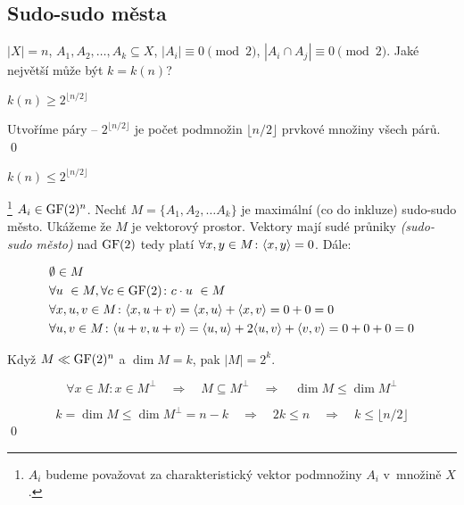 \subsection{Sudo-sudo města}

\df $|X| = n$, $A_1, A_2, \dots, A_k \subseteq X$, $|A_i| \equiv 0 \pmod 2$, $|A_i\cap
A_j| \equiv 0 \pmod 2$. Jaké největší může být $k = k(n)$?

\vt $k(n) \ge 2^{\lfloor n / 2 \rfloor}$

\dk Utvoříme páry -- $2^{\lfloor n / 2 \rfloor}$ je počet podmnožin $\lfloor n / 2
\rfloor$ prvkové množiny všech párů. \qed

\vt $k(n) \le 2^{\lfloor n / 2 \rfloor}$

\dk\footnote{$A_i$ budeme považovat za charakteristický vektor podmnožiny $A_i$
v~množině $X$.} $A_i \in \mathrm{GF}(2)^n$. Nechť $M=\{A_1, A_2, \dots A_k\}$ je maximální (co do inkluze)
sudo-sudo město. Ukážeme že $M$ je vektorový prostor.
Vektory mají sudé průniky {\it (sudo-sudo město)} nad $\mathrm{GF}(2)$ tedy platí $\forall x,y\in M\colon {\langle x,y\rangle} = 0$.
Dále:

\begin{align}
	&\emptyset \in M \\
	&\forall u~\in M, \forall c\in \mathrm{GF}(2)\colon c\cdot u~\in M \\
	&\forall x,u,v\in M\colon {\langle x, u+v\rangle} = {\langle x,u\rangle} + {\langle x,v\rangle} = 0 + 0 = 0 \\
	&\forall u,v \in M\colon {\langle u+v,u+v\rangle} = {\langle u,u\rangle} + 2{\langle u,v\rangle} + {\langle v,v\rangle} = 0 + 0 + 0 = 0
\end{align}

Když $M \ll \mathrm{GF}(2)^n$ a $\dim M = k$, pak $|M| = 2^k$. 

$$\forall x\in M\colon x\in M^\bot \quad\Rightarrow\quad M\subseteq M^\bot \quad\Rightarrow\quad \dim M \le \dim M^\bot$$

$$k = \dim M \le \dim M^\bot = n-k \quad\Rightarrow\quad 2k \le n
\quad\Rightarrow\quad k \le \lfloor {n / 2} \rfloor$$
\qed



